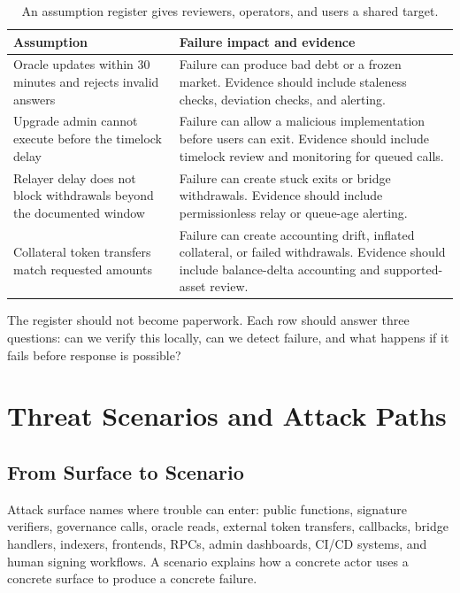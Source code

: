 \begin{table}[htbp]
\centering
\small
\renewcommand{\arraystretch}{1.18}
\begin{tabularx}{\textwidth}{@{}>{\RaggedRight\arraybackslash}p{}X@{}}
\toprule
Assumption & Failure impact and evidence \\
\midrule
Oracle updates within 30 minutes and rejects invalid answers & Failure can produce bad debt or a frozen market. Evidence should include staleness checks, deviation checks, and alerting. \\
Upgrade admin cannot execute before the timelock delay & Failure can allow a malicious implementation before users can exit. Evidence should include timelock review and monitoring for queued calls. \\
Relayer delay does not block withdrawals beyond the documented window & Failure can create stuck exits or bridge withdrawals. Evidence should include permissionless relay or queue-age alerting. \\
Collateral token transfers match requested amounts & Failure can create accounting drift, inflated collateral, or failed withdrawals. Evidence should include balance-delta accounting and supported-asset review. \\
\bottomrule
\end{tabularx}
\caption{An assumption register gives reviewers, operators, and users a shared target.}
\end{table}

The register should not become paperwork. Each row should answer three questions: can we verify this locally, can we detect failure, and what happens if it fails before response is possible?

\section{Threat Scenarios and Attack Paths}

\subsection{From Surface to Scenario}

Attack surface names where trouble can enter: public functions, signature verifiers, governance calls, oracle reads, external token transfers, callbacks, bridge handlers, indexers, frontends, RPCs, admin dashboards, CI/CD systems, and human signing workflows. A scenario explains how a concrete actor uses a concrete surface to produce a concrete failure.

